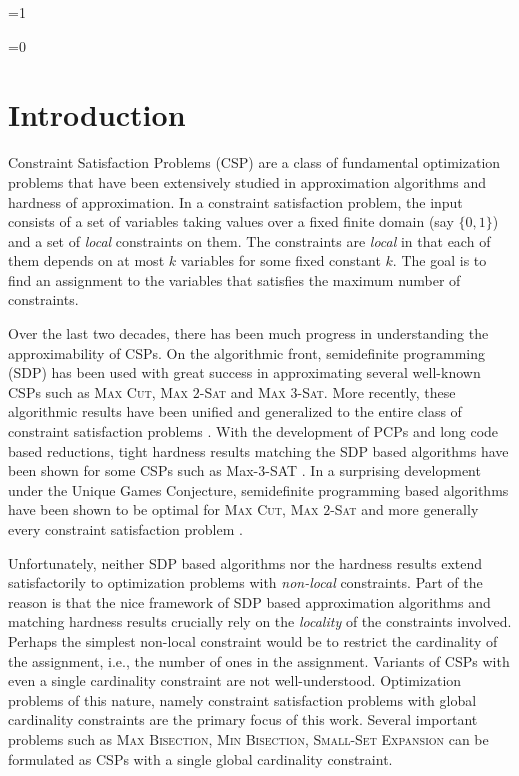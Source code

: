 \documentclass[11pt]{article}
\def\full{1}
\def\showtableofcontents{1}
\theoremstyle{definition}
\newcommand{\problemmacro}[1]{\texorpdfstring{\textsc{#1}}{#1}\xspace}
\newcommand{\maxcut}{\problemmacro{Max Cut}}
\newcommand{\maxtwosat}{\problemmacro{Max $2$-Sat}}
\newcommand{\maxthreesat}{\problemmacro{Max $3$-Sat}}
\newcommand{\smallsetexpansion}{\problemmacro{Small-Set Expansion}}
\newcommand{\minbisection}{\problemmacro{Min Bisection}}
\newcommand{\maxbisection}{\problemmacro{Max Bisection}}
\numberwithin{equation}{section}
\begin{document}
\ifnum\showtableofcontents=1
{
\tableofcontents
\thispagestyle{empty}
\clearpage
 }
\fi


\setcounter{page}{1}
\ifnum\full=0 \vspace{-8pt}\fi

\section{Introduction} \label{sec:intro}

Constraint Satisfaction Problems (CSP) are a class of fundamental
optimization problems that have been extensively studied in
approximation algorithms and hardness of approximation.  In  a
constraint satisfaction problem, the input consists of a set of
variables taking values over a fixed finite domain (say $\{0,1\}$) and
a set of {\it local} constraints on them.  The constraints are {\it
local} in that each of them depends on at most $k$ variables for some
fixed constant $k$.  The goal is to find an assignment to the
variables that satisfies the maximum number of constraints.

Over the last two decades, there has been much progress in understanding the approximability of
CSPs.  On the algorithmic front, semidefinite programming (SDP) has been
used with great success in approximating several well-known CSPs such
as \maxcut \cite{GoemansW95}, \maxtwosat \cite{CharikarMM07a} and
\maxthreesat \cite{KarloffZ97}.  More recently, these
algorithmic results have been unified and generalized to the entire class of constraint
satisfaction problems \cite{RaghavendraS09b}.  With the development of PCPs and long code based reductions, tight
hardness results matching the SDP based algorithms have been shown for
some CSPs such as Max-3-SAT \cite{Hastad01}.  In a surprising
development under the Unique Games Conjecture, semidefinite programming based algorithms have been shown
to be optimal for \maxcut \cite{KhotKMO07}, \maxtwosat
\cite{Austrin07a} and more generally every constraint satisfaction problem \cite{Raghavendra08}.

Unfortunately, neither SDP based algorithms nor the hardness
results extend satisfactorily to optimization problems with {\it
non-local} constraints.  Part of the reason is that the nice framework of SDP based approximation algorithms and matching
hardness results crucially rely on the {\it locality} of the constraints
involved.  Perhaps the simplest non-local constraint would be to
restrict the cardinality of the assignment, i.e., the number of ones
in the assignment.  Variants of CSPs with even a single cardinality constraint are not well-understood.
Optimization problems of this nature, namely constraint satisfaction problems with global cardinality constraints are the primary focus of this work.
Several important problems such as \maxbisection, \minbisection,
\smallsetexpansion can be formulated as CSPs with a single global cardinality
constraint.
\end{document}
